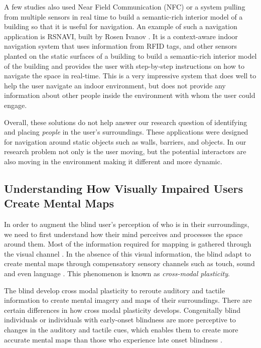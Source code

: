 A few studies also used Near Field Communication (NFC) or a system pulling from multiple sensors in real time to build a semantic-rich interior model of a building so that it is useful for navigation. An example of such a navigation application is RSNAVI, built by Rosen Ivanov \cite{Ivanov:2012ab}.  It is a context-aware indoor navigation system that uses information from RFID tags, and other sensors planted on the static surfaces of a building to build a semantic-rich interior model of the building and provides the user with step-by-step instructions on how to navigate the space in real-time. This is a very impressive system that does well to help the user navigate an indoor environment, but does not provide any information about other people inside the environment with whom the user could engage. 

Overall, these solutions do not help answer our research question of identifying and placing \textit{people} in the user's surroundings. These applications were designed for navigation around static objects such as walls, barriers, and objects. In our research problem not only  is the user moving, but the potential interactors are also moving  in the environment making it different and more dynamic. 

\subsection{Understanding How Visually Impaired Users Create Mental Maps}
In order to augment the blind user's perception of who is in their surroundings, we need to first understand how their mind perceives and processes the space around them. Most of the information required for mapping is gathered through the visual channel \cite{lynch1960image}. In the absence of this visual information, the blind adapt to create mental maps through compensatory sensory channels such as touch, sound and even language \cite{jacobson1993art,bavelier2002cross,roder2001auditory,petitto2000speech,liotti1998auditory,leclerc2000brain,kujala1995visual}. This phenomenon is known as \textit{cross-modal plasticity}\cite {bavelier2002cross}.

The blind develop cross modal plasticity to reroute auditory and tactile information to create mental imagery and maps of their surroundings. There are certain differences in how cross modal plasticity develops. Congenitally blind individuals or individuals with early-onset blindness are more perceptive to changes in the auditory and tactile cues, which enables them to create more accurate mental maps than those who experience late onset blindness \cite{ptito2008alterations}.

